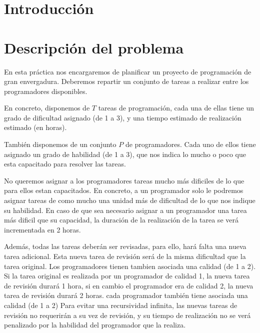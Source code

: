 \documentclass[12pt]{article}
\author{Carlos Bergillos, Adrià Cabeza, Roger Vilaseca}
\begin{document}
\maketitle

\newpage

\tableofcontents

\newpage


\section{Introducción}

\section{Descripción del problema}
En esta práctica nos encargaremos de planificar un proyecto de programación de gran envergadura.
Deberemos repartir un conjunto de tareas a realizar entre los programadores disponibles.

En concreto, disponemos de $T$ tareas de programación, cada una de ellas tiene un grado de dificultad asignado (de 1 a 3), y una tiempo estimado de realización estimado (en horas).

También disponemos de un conjunto $P$ de programadores. Cada uno de ellos tiene asignado un grado de habilidad (de 1 a 3), que nos indica lo mucho o poco que esta capacitado para resolver las tareas.

No queremos asignar a los programadores tareas mucho más dificiles de lo que para ellos estan capacitados. En concreto, a un programador solo le podremos asignar tareas de como mucho una unidad más de dificultad de lo que nos indique su habilidad. En caso de que sea necesario asignar a un programador una tarea más dificil que su capacidad, la duración de la realización de la tarea se verá incrementada en 2 horas.

Además, todas las tareas deberán ser revisadas, para ello, hará falta una nueva tarea adicional. Esta nueva tarea de revisión será de la misma dificultad que la tarea original.
Los programadores tienen tambien asociada una calidad (de 1 a 2). Si la tarea original es realizada por un programador de calidad 1, la nueva tarea de revisión durará 1 hora, si en cambio el programador era de calidad 2, la nueva tarea de revisión durará 2 horas. 
cada programador también tiene asociada una calidad (de 1 a 2)
Para evitar una recursividad infinita, las nuevas tareas de revisión no requerirán a su vez de revisión, y su tiempo de realización no se verá penalizado por la habilidad del programador que la realiza.
\end{document}
